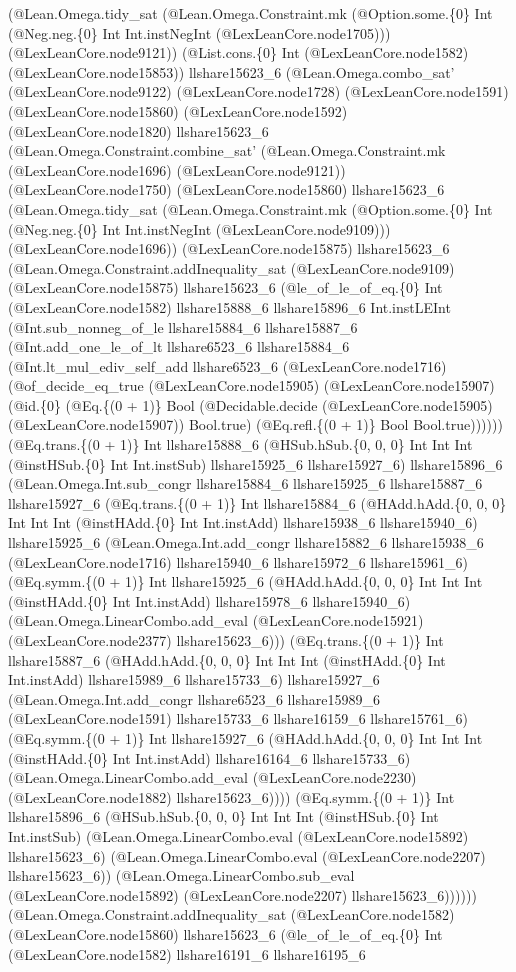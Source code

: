 \documentclass[11pt]{article}
\begin{document}
(@Lean.Omega.tidy\_sat (@Lean.Omega.Constraint.mk (@Option.some.\{0\} Int (@Neg.neg.\{0\} Int Int.instNegInt (@LexLeanCore.node1705))) (@LexLeanCore.node9121)) (@List.cons.\{0\} Int (@LexLeanCore.node1582) (@LexLeanCore.node15853)) llshare15623\_6 (@Lean.Omega.combo\_sat' (@LexLeanCore.node9122) (@LexLeanCore.node1728) (@LexLeanCore.node1591) (@LexLeanCore.node15860) (@LexLeanCore.node1592) (@LexLeanCore.node1820) llshare15623\_6 (@Lean.Omega.Constraint.combine\_sat' (@Lean.Omega.Constraint.mk (@LexLeanCore.node1696) (@LexLeanCore.node9121)) (@LexLeanCore.node1750) (@LexLeanCore.node15860) llshare15623\_6 (@Lean.Omega.tidy\_sat (@Lean.Omega.Constraint.mk (@Option.some.\{0\} Int (@Neg.neg.\{0\} Int Int.instNegInt (@LexLeanCore.node9109))) (@LexLeanCore.node1696)) (@LexLeanCore.node15875) llshare15623\_6 (@Lean.Omega.Constraint.addInequality\_sat (@LexLeanCore.node9109) (@LexLeanCore.node15875) llshare15623\_6 (@le\_of\_le\_of\_eq.\{0\} Int (@LexLeanCore.node1582) llshare15888\_6 llshare15896\_6 Int.instLEInt (@Int.sub\_nonneg\_of\_le llshare15884\_6 llshare15887\_6 (@Int.add\_one\_le\_of\_lt llshare6523\_6 llshare15884\_6 (@Int.lt\_mul\_ediv\_self\_add llshare6523\_6 (@LexLeanCore.node1716) (@of\_decide\_eq\_true (@LexLeanCore.node15905) (@LexLeanCore.node15907) (@id.\{0\} (@Eq.\{(0 + 1)\} Bool (@Decidable.decide (@LexLeanCore.node15905) (@LexLeanCore.node15907)) Bool.true) (@Eq.refl.\{(0 + 1)\} Bool Bool.true)))))) (@Eq.trans.\{(0 + 1)\} Int llshare15888\_6 (@HSub.hSub.\{0, 0, 0\} Int Int Int (@instHSub.\{0\} Int Int.instSub) llshare15925\_6 llshare15927\_6) llshare15896\_6 (@Lean.Omega.Int.sub\_congr llshare15884\_6 llshare15925\_6 llshare15887\_6 llshare15927\_6 (@Eq.trans.\{(0 + 1)\} Int llshare15884\_6 (@HAdd.hAdd.\{0, 0, 0\} Int Int Int (@instHAdd.\{0\} Int Int.instAdd) llshare15938\_6 llshare15940\_6) llshare15925\_6 (@Lean.Omega.Int.add\_congr llshare15882\_6 llshare15938\_6 (@LexLeanCore.node1716) llshare15940\_6 llshare15972\_6 llshare15961\_6) (@Eq.symm.\{(0 + 1)\} Int llshare15925\_6 (@HAdd.hAdd.\{0, 0, 0\} Int Int Int (@instHAdd.\{0\} Int Int.instAdd) llshare15978\_6 llshare15940\_6) (@Lean.Omega.LinearCombo.add\_eval (@LexLeanCore.node15921) (@LexLeanCore.node2377) llshare15623\_6))) (@Eq.trans.\{(0 + 1)\} Int llshare15887\_6 (@HAdd.hAdd.\{0, 0, 0\} Int Int Int (@instHAdd.\{0\} Int Int.instAdd) llshare15989\_6 llshare15733\_6) llshare15927\_6 (@Lean.Omega.Int.add\_congr llshare6523\_6 llshare15989\_6 (@LexLeanCore.node1591) llshare15733\_6 llshare16159\_6 llshare15761\_6) (@Eq.symm.\{(0 + 1)\} Int llshare15927\_6 (@HAdd.hAdd.\{0, 0, 0\} Int Int Int (@instHAdd.\{0\} Int Int.instAdd) llshare16164\_6 llshare15733\_6) (@Lean.Omega.LinearCombo.add\_eval (@LexLeanCore.node2230) (@LexLeanCore.node1882) llshare15623\_6)))) (@Eq.symm.\{(0 + 1)\} Int llshare15896\_6 (@HSub.hSub.\{0, 0, 0\} Int Int Int (@instHSub.\{0\} Int Int.instSub) (@Lean.Omega.LinearCombo.eval (@LexLeanCore.node15892) llshare15623\_6) (@Lean.Omega.LinearCombo.eval (@LexLeanCore.node2207) llshare15623\_6)) (@Lean.Omega.LinearCombo.sub\_eval (@LexLeanCore.node15892) (@LexLeanCore.node2207) llshare15623\_6)))))) (@Lean.Omega.Constraint.addInequality\_sat (@LexLeanCore.node1582) (@LexLeanCore.node15860) llshare15623\_6 (@le\_of\_le\_of\_eq.\{0\} Int (@LexLeanCore.node1582) llshare16191\_6 llshare16195\_6 
\end{document}
